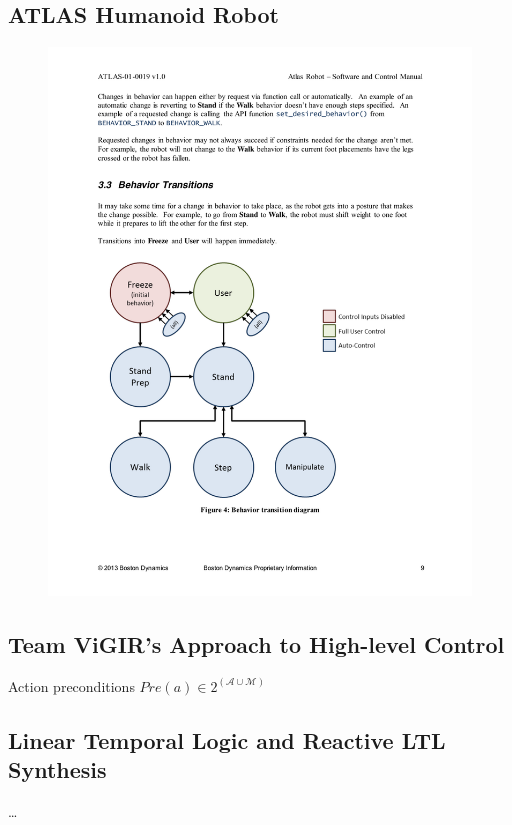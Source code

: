 
\subsection{ATLAS Humanoid Robot}

\begin{figure}[t]
\centering
\includegraphics[width=0.95\columnwidth,clip]{./img/control_modes_ts.pdf}
\caption{
}
\label{Fig:ControlModeTS}
\end{figure}

\subsection{Team ViGIR's Approach to High-level Control}

Action preconditions $Pre(a) \in 2^{(\mathcal{A} \cup \mathcal{M})}$

\subsection{Linear Temporal Logic and Reactive LTL Synthesis}

\ldots
